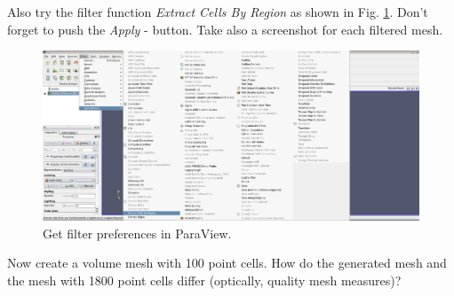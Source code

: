 Also try the filter function \emph{Extract Cells By Region} as shown in Fig. \ref{ParaviewFilterScreenshot}. 
Don't forget to push the \emph{Apply} - button. 
Take also a screenshot for each filtered mesh.

\begin{figure}[h]
  	\centering
    \includegraphics[width=\textwidth]{pictures/paraview_filter.png}
    \caption{Get filter preferences in ParaView.}
    \label{ParaviewFilterScreenshot}
\end{figure}

Now create a volume mesh with 100 point cells.
How do the generated mesh and the mesh with 1800 point cells differ (optically, quality mesh measures)?